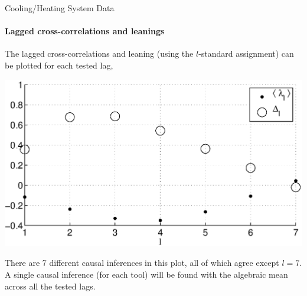 \documentclass{beamer}
\begin{document}
\begin{frame}{Cooling/Heating System Data}
\framesubtitle{Lagged cross-correlations and leanings}
The lagged cross-correlations and leaning (using the $l$-standard assignment) can be plotted for each tested lag,
\begin{center}
\includegraphics[scale=0.50]{CoolingSystemExample_LandLCC.eps}\\
\end{center}
\pause
There are 7 different causal inferences in this plot, all of which agree except $l=7$.\pause \alert{  A single causal inference (for each tool) will be found with the algebraic mean across all the tested lags.}
\end{frame}
\end{document}
